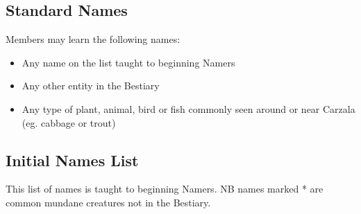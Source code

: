 \subsection{Standard Names}

Members may learn the following names:
\begin{itemize}
  \item Any name on the list taught to beginning Namers
  \item  Any other entity in the Bestiary
  \item Any type of plant, animal, bird or fish commonly seen around or near Carzala (eg. cabbage
    or trout)
\end{itemize}

\subsection{Initial Names List}
This list of names is taught to beginning Namers.
NB names marked * are common mundane creatures not in the Bestiary.

